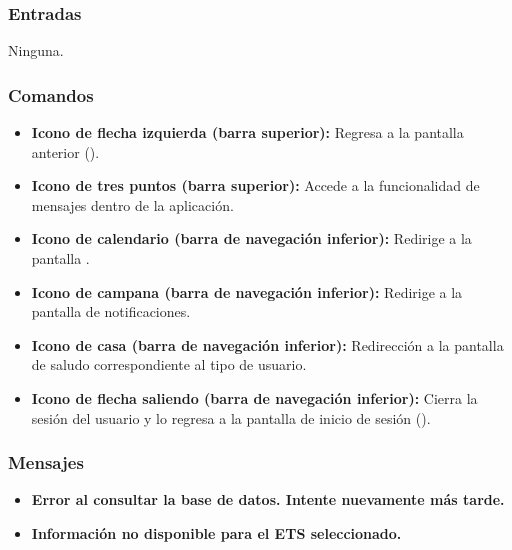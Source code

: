 \subsubsection{Entradas}
Ninguna.

\subsubsection{Comandos}
\begin{itemize}
	\item \textbf{Icono de flecha izquierda (barra superior):} Regresa a la pantalla anterior ().
	\item \textbf{Icono de tres puntos (barra superior):} Accede a la funcionalidad de mensajes dentro de la aplicación.
	\item \textbf{Icono de calendario (barra de navegación inferior):} Redirige a la pantalla .
	\item \textbf{Icono de campana (barra de navegación inferior):} Redirige a la pantalla de notificaciones.
	\item \textbf{Icono de casa (barra de navegación inferior):} Redirección a la pantalla de saludo correspondiente al tipo de usuario.
	\item \textbf{Icono de flecha saliendo (barra de navegación inferior):} Cierra la sesión del usuario y lo regresa a la pantalla de inicio de sesión ().
\end{itemize}

\subsubsection{Mensajes}
\begin{itemize}
	\item \textbf{Error al consultar la base de datos. Intente nuevamente más tarde.}
	\item \textbf{Información no disponible para el ETS seleccionado.}
\end{itemize}


